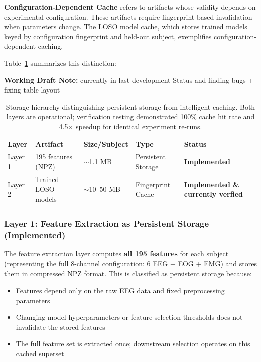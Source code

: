 \documentclass{imc-inf} %
\begin{document}
\textbf{Configuration-Dependent Cache} refers to artifacts whose validity depends on experimental configuration. These artifacts require fingerprint-based invalidation when parameters change. The LOSO model cache, which stores trained models keyed by configuration fingerprint and held-out subject, exemplifies configuration-dependent caching.

Table~\ref{tab:storage_hierarchy} summarizes this distinction:

\begin{center}
\colorbox{yellow!20}{%
\begin{minipage}{0.9\textwidth}
\textbf{Working Draft Note:} 
currently in last development Status and finding bugs + fixing table layout
\end{minipage}
}
\end{center}
\begin{table}[ht]
\centering
\begin{tabular}{|l|l|l|l|l|}
\hline
\textbf{Layer} & \textbf{Artifact} & \textbf{Size/Subject} & \textbf{Type} & \textbf{Status} \\
\hline
Layer 1 & 195 features (NPZ) & $\sim$1.1 MB & Persistent Storage & \textbf{Implemented} \\
\hline
Layer 2 & Trained LOSO models & $\sim$10--50 MB & Fingerprint Cache & \textbf{Implemented \& currently verfied} \\
\hline
\end{tabular}
\caption{Storage hierarchy distinguishing persistent storage from intelligent 
caching. Both layers are operational; verification testing demonstrated 
100\% cache hit rate and 4.5$\times$ speedup for identical experiment re-runs.}
\label{tab:storage_hierarchy}
\end{table}

\subsubsection{Layer 1: Feature Extraction as Persistent Storage (Implemented)}

The feature extraction layer computes \textbf{all 195 features} for each subject (representing the full 8-channel configuration: 6 EEG + EOG + EMG) and stores them in compressed NPZ format. This is classified as persistent storage because:

\begin{itemize}
    \item Features depend only on the raw EEG data and fixed preprocessing parameters
    \item Changing model hyperparameters or feature selection thresholds does not invalidate the stored features
    \item The full feature set is extracted once; downstream selection operates on this cached superset
\end{itemize}
\end{document}
